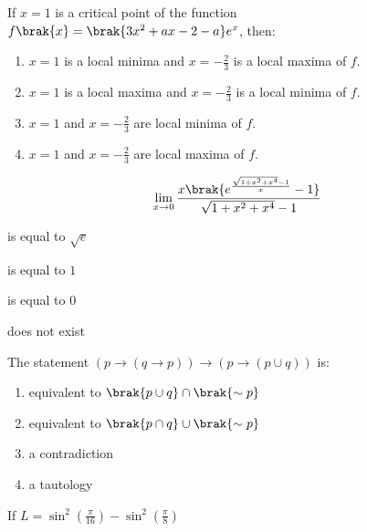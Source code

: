 \iffalse
  \title{Assignment 4}
  \author{Charitha Sri}
  \section{mcq-single}
\fi


\item If $x=1$ is a critical point of the function $f\brak{x} = \brak{3x^{2}+ax-2-a}e^{x}$, then:        
\begin{enumerate}                            
\item $x=1$ is a local minima and $x = -\frac{2}{3}$ is a local maxima of $f$.          
\item $x=1$ is a local maxima and $x=-\frac{2}{3}$ is a local minima of $f$.            
\item $x=1$ and $x=-\frac{2}{3}$ are local minima of $f$.           
\item $x=1$ and $x=-\frac{2}{3}$ are local maxima of $f$.       
\end{enumerate}
\item
	  \begin{align}
		  \lim_{x \to 0}\frac{x\brak{{e}^{\frac{\sqrt{1+x^{2}+x^{4}} - 1}{x}} -1 }}{\sqrt{1+x^{2}+x^{4}} - 1}
	  \end{align}
\begin{enumerate}
  \begin{multicols}{4}
  \item  is equal to $\sqrt{e}$
  \item is equal to $1$
  \item is equal to $0$
  \item does not exist
  \end{multicols}
  \end{enumerate}
 \item The statement $(p \rightarrow (q \rightarrow p)) \rightarrow (p \rightarrow (p \cup q))$ is:
  \begin{enumerate}
 \item equivalent to $\brak{p \cup q} \cap \brak{ \sim p}$       
 \item equivalent to $\brak{p \cap q} \cup \brak{ \sim p}$      
 \item a contradiction
  \item a tautology
  \end{enumerate}
  \item If $L = \sin^2\left(\frac{\pi}{16}\right) - \sin^2\left(\frac{\pi}{8}\right)$
